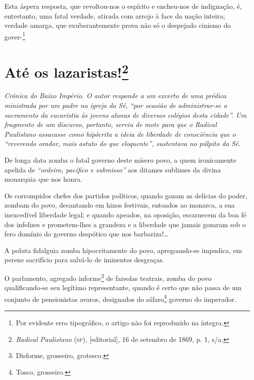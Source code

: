 Esta áspera resposta, que revoltou-nos o espírito e encheu-nos de
indignação, é, entretanto, uma fatal verdade, atirada com arrojo à face
da nação inteira; verdade amarga, que exuberantemente prova não só o
despejado cinismo do gover-\footnote{Por evidente erro tipográfico, o
  artigo não foi reproduzido na íntegra.}

\chapter{Até os lazaristas!\footnote{\emph{Radical Paulistano} (\textsc{sp}),
  {[}editorial{]}, 16 de setembro de 1869, p. 1, s/a.}}

\begin{didascalia}\itshape
Crônica do Baixo Império. O autor responde a um excerto de uma prédica
ministrada por um padre na igreja da Sé, ``por ocasião de administrar-se
o sacramento da eucaristia às jovens alunas de diversos colégios desta
cidade''. Um fragmento de um discurso, portanto, serviu de mote para que
o \textnormal{Radical Paulistano} assacasse como hipócrita a ideia de liberdade
de consciência que o ``reverendo orador, mais astuto do que eloquente'',
sustentava no púlpito da Sé.
\end{didascalia}



De longa data zomba o fatal governo deste mísero povo, a quem
ironicamente apelida de \emph{``ordeiro, pacífico e submisso''} aos %
ditames sublimes da divina monarquia que nos honra.

Os corrompidos chefes dos partidos políticos, quando gozam as delícias
do poder, zombam do povo, decantando em hinos festivais, entoados ao
monarca, a sua inexcedível liberdade legal; e quando apeados, na
oposição, escarnecem da boa fé dos infelizes e prometem-lhes a grandeza
e a liberdade que jamais gozaram sob o fero domínio do governo despótico
que nos barbariza!\ldots{}

A poluta fidalguia zomba hipocritamente do povo, apregoando-se impudica,
em perene sacrifício para salvá-lo de iminentes desgraças.

O parlamento, agregado informe\footnote{Disforme, grosseiro, grotesco.}
de farsolas teatrais, zomba do povo qualificando-se seu legítimo
representante, quando é certo que não passa de um conjunto de
pensionistas avaros, designados do sáfaro\footnote{Tosco, grosseiro.}
governo do imperador.

